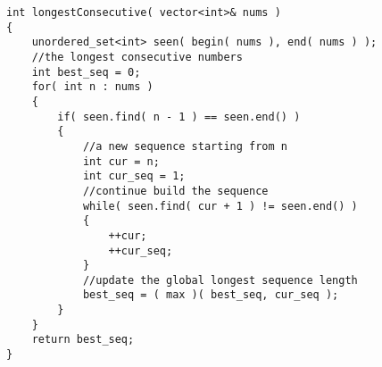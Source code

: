 \begin{lstlisting}[style=customc, caption={Hash Set}]
int longestConsecutive( vector<int>& nums )
{
    unordered_set<int> seen( begin( nums ), end( nums ) );
    //the longest consecutive numbers
    int best_seq = 0;
    for( int n : nums )
    {
        if( seen.find( n - 1 ) == seen.end() )
        {
            //a new sequence starting from n
            int cur = n;
            int cur_seq = 1;
            //continue build the sequence
            while( seen.find( cur + 1 ) != seen.end() )
            {
                ++cur;
                ++cur_seq;
            }
            //update the global longest sequence length
            best_seq = ( max )( best_seq, cur_seq );
        }
    }
    return best_seq;
}
\end{lstlisting}